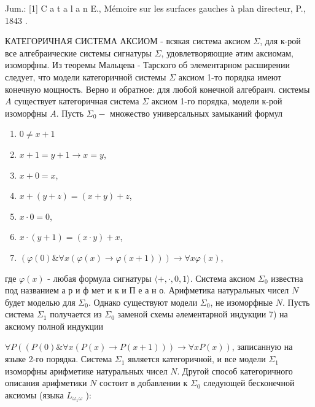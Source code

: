 \documentclass[10pt]{article}
\begin{document}
Jum.: [1] C a t a l a n E., Mémoire sur les surfaces gauches à plan directeur, P., 1843 .



КАТЕГОРИЧНАЯ СИСТЕМА АКСИОМ - всякая система аксиом $\Sigma$, для к-рой все алгебраические системы сигнатуры $\Sigma$, удовлетворяющие әтим аксиомам, изоморфны. Из теоремы Мальцева - Тарского об элементарном расширении следует, что модели категоричной системы $\Sigma$ аксиом 1-то порядка имеют конечную мощность. Верно и обратное: для любой конечной алгебраич. системы $A$ существует категоричная система $\Sigma$ аксиом 1-го порядка, модели к-рой изоморфны $A$. Пусть $\Sigma_{0}-$ множество универсальных замыканий формул



\begin{enumerate}

  \item $0 \neq x+1$

  \item $x+1=y+1 \longrightarrow x=y$,

  \item $x+0=x$,

  \item $x+(y+z)=(x+y)+z$,

  \item $x \cdot 0=0$,

  \item $x \cdot(y+1)=(x \cdot y)+x$,

  \item $(\varphi(0) \& \forall x(\varphi(x) \longrightarrow \varphi(x+1))) \longrightarrow \forall x \varphi(x)$,

\end{enumerate}



где $\varphi(x)$ - любая формула сигнатуры $\langle+, \cdot, 0,1\rangle$. Система аксиом $\Sigma_{0}$ известна под названием а р и ф мет и к и П е а н о. Арифметика натуральных чисел $N$ будет моделью для $\Sigma_{0}$. Однако существуют модели $\Sigma_{0}$, не изоморфные $N$. Пусть система $\Sigma_{1}$ получается из $\Sigma_{0}$ заменой схемы әлементарной индукции 7) на аксиому полной индукции



$\forall P((P(0) \& \forall x(P(x) \longrightarrow P(x+1))) \longrightarrow \forall x P(x))$, записанную на языке 2-го порядка. Система $\Sigma_{1}$ является категоричной, и все модели $\Sigma_{1}$ изоморфны арифметике натуральных чисел $N$. Другой способ категоричного описания арифметики $N$ состоит в добавлении к $\Sigma_{0}$ следующей бесконечной аксиомы (языка $L_{\omega_{1} \omega}$ ):
\end{document}
